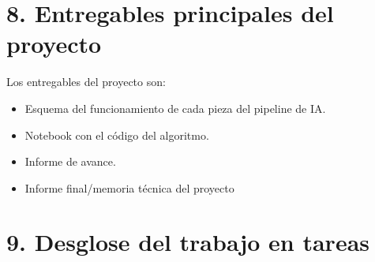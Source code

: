 \documentclass[
11pt, %
]{charter}
\begin{document}
\section{8. Entregables principales del proyecto}
\label{sec:entregables}

Los entregables del proyecto son:

\begin{itemize}
	\item Esquema del funcionamiento de cada pieza del pipeline de IA.
	\item Notebook con el código del algoritmo.
	\item Informe de avance.
	\item Informe final/memoria técnica del proyecto
\end{itemize}

\section{9. Desglose del trabajo en tareas}
\label{sec:wbs}
\end{document}
